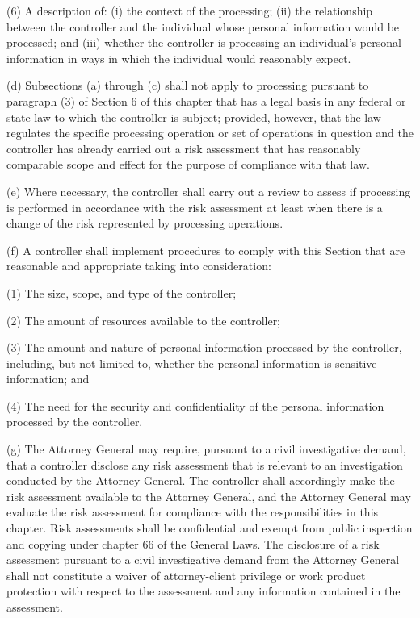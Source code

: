 (6) A description of: (i) the context of the processing; (ii) the relationship between the controller and the individual whose personal information would be processed; and (iii) whether the controller is processing an individual’s personal information in ways in which the individual would reasonably expect.

(d) Subsections (a) through (c) shall not apply to processing pursuant to paragraph (3) of Section 6 of this chapter that has a legal basis in any federal or state law to which the controller is subject; provided, however, that the law regulates the specific processing operation or set of operations in question and the controller has already carried out a risk assessment that has reasonably comparable scope and effect for the purpose of compliance with that law.   

(e) Where necessary, the controller shall carry out a review to assess if processing is performed in accordance with the risk assessment at least when there is a change of the risk represented by processing operations.

(f) A controller shall implement procedures to comply with this Section that are reasonable and appropriate taking into consideration:

(1) The size, scope, and type of the controller;

(2) The amount of resources available to the controller;

(3) The amount and nature of personal information processed by the controller, including, but not limited to, whether the personal information is sensitive information; and

(4) The need for the security and confidentiality of the personal information processed by the controller. 

(g) The Attorney General may require, pursuant to a civil investigative demand, that a controller disclose any risk assessment that is relevant to an investigation conducted by the Attorney General. The controller shall accordingly make the risk assessment available to the Attorney General, and the Attorney General may evaluate the risk assessment for compliance with the responsibilities in this chapter. Risk assessments shall be confidential and exempt from public inspection and copying under chapter 66 of the General Laws. The disclosure of a risk assessment pursuant to a civil investigative demand from the Attorney General shall not constitute a waiver of attorney-client privilege or work product protection with respect to the assessment and any information contained in the assessment.

